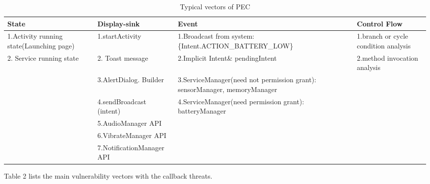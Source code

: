 %
%



\begin{table}[htbp]
\centering
 \caption{\label{tab:test} Typical vectors of PEC}
 \begin{tabularx}{\linewidth}{XXXX}

  \toprule
  State & Display-sink & Event & Control Flow \\
  \midrule
 1.Activity running state(Launching page) & 1.startActivity & 1.Broadcast from system: \{Intent.ACTION\_BATTERY\_LOW\} & 1.branch or cycle condition analysis \\
  2. Service running state &2. Toast message & 2.Implicit Intent\& pendingIntent & 2.method invocation analysis\\
     & 3.AlertDialog. Builder & 3.ServiceManager(need not permission grant): { sensorManager, memoryManager }\\
     & 4.sendBroadcast (intent)& 4.ServiceManager(need permission grant): { batteryManager }\\     
     & 5.AudioManager API & \\
     & 6.VibrateManager API & \\
     & 7.NotificationManager API & \\
     
  \bottomrule
 \end{tabularx}
\end{table}



{\color{red}Table 2} lists the main vulnerability vectors with the callback threats. 
